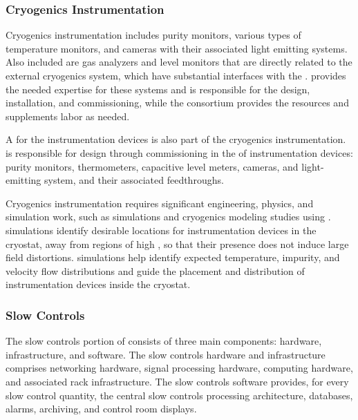 \subsubsection{Cryogenics Instrumentation}
Cryogenics instrumentation includes purity monitors,  various types of temperature monitors, and cameras with their associated light emitting systems. Also included are %
gas analyzers and  level monitors that are directly related to the external cryogenics system, which have substantial interfaces with the .  provides the needed expertise  for these systems and is responsible for the design, installation, and commissioning, while the  consortium provides the resources and supplements labor as needed. 

A  for the instrumentation devices is also part of the cryogenics instrumentation.
  is responsible for design through commissioning in the  %
of  instrumentation devices: purity monitors, thermometers, capacitive level meters, cameras, and light-emitting system, and their associated feedthroughs.

Cryogenics instrumentation %
requires significant engineering, physics, and
simulation work, such as \efield simulations and cryogenics modeling
studies using . \efield simulations
identify desirable locations for instrumentation
devices in the cryostat, away from %
regions of high \efield, so that %
their presence does not induce large field distortions. 
 simulations help identify %
expected temperature, impurity, and velocity flow distributions and guide the placement and distribution of instrumentation devices inside the cryostat.

\subsubsection{Slow Controls}
\label{sec:sp-cisc-slowctrl}
The slow controls portion of  consists of three main components: 
hardware, infrastructure, and software. The slow controls hardware and infrastructure comprises networking hardware, signal processing hardware, computing hardware, and associated rack infrastructure. The slow controls software provides, for every slow control quantity, the central slow controls processing architecture, databases, alarms, archiving, and control room displays.


